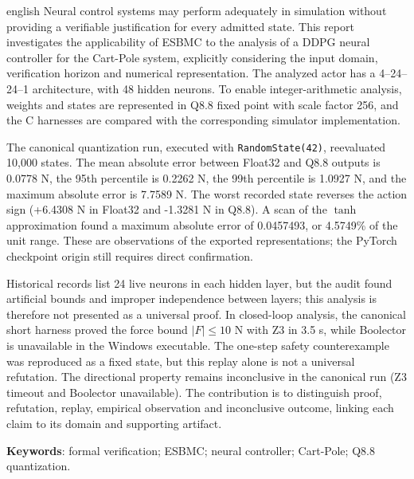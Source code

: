 \begin{resumo}[Abstract]
\begin{otherlanguage*}{english}
Neural control systems may perform adequately in simulation without providing a
verifiable justification for every admitted state. This report investigates the
applicability of ESBMC to the analysis of a DDPG neural controller for the Cart-Pole
system, explicitly considering the input domain, verification horizon and numerical
representation. The analyzed actor has a 4--24--24--1 architecture, with 48 hidden
neurons. To enable integer-arithmetic analysis, weights and states are represented
in Q8.8 fixed point with scale factor 256, and the C harnesses are compared with
the corresponding simulator implementation.

The canonical quantization run, executed with \texttt{RandomState(42)}, reevaluated
10,000 states. The mean absolute error between Float32 and Q8.8 outputs is
0.0778 N, the 95th percentile is 0.2262 N, the 99th percentile is 1.0927 N,
and the maximum absolute error is 7.7589 N. The worst recorded state reverses
the action sign (+6.4308 N in Float32 and -1.3281 N in Q8.8). A scan of the
$\tanh$ approximation found a maximum absolute error of 0.0457493, or 4.5749\%
of the unit range. These are observations of the exported representations; the
PyTorch checkpoint origin still requires direct confirmation.

Historical records list 24 live neurons in each hidden layer, but the audit found
artificial bounds and improper independence between layers; this analysis is
therefore not presented as a universal proof. In closed-loop analysis, the
canonical short harness proved the force bound $|F|\leq 10$ N with Z3 in 3.5 s,
while Boolector is unavailable in the Windows executable. The one-step safety
counterexample was reproduced as a fixed state, but this replay alone is not a
universal refutation. The directional property remains inconclusive in the
canonical run (Z3 timeout and Boolector unavailable). The contribution is to
distinguish proof, refutation, replay, empirical observation and inconclusive
outcome, linking each claim to its domain and supporting artifact.

\textbf{Keywords}: formal verification; ESBMC; neural controller; Cart-Pole; Q8.8 quantization.
\end{otherlanguage*}
\end{resumo}
